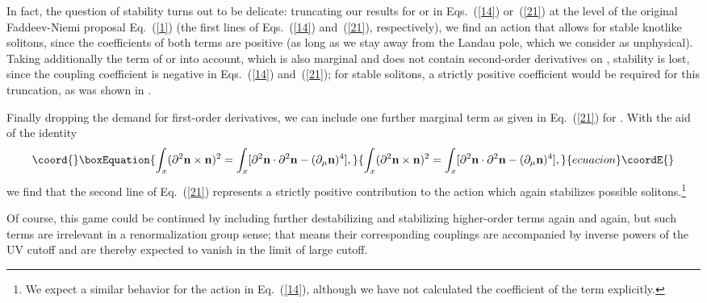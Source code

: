 \documentclass[a4paper,12pt]{article}
\providecommand{\re}[1]{~(\ref{#1})}\usepackage{useful_macros}
\begin{document}
In fact, the question of stability turns out to be delicate:
truncating our results for \coordHE{} or \coordHE{} in
Eqs.\re{14} or\re{21} at the level of the original Faddeev-Niemi
proposal Eq.\re{1} (the first lines of Eqs.\re{14} and\re{21},
respectively), we find an action that allows for stable knotlike
solitons, since the coefficients of both terms are positive (as long
as we stay away from the Landau pole, which we consider as unphysical).
Taking additionally the \coordHE{} term of \coordHE{} or
\coordHE{} into account, which is also marginal and does not contain
second-order derivatives on \myHighlight{$\mn$}\coordHE{}, stability is lost, since the
coupling coefficient is negative in Eqs.\re{14} and\re{21}; for stable
solitons, a strictly positive coefficient would be required for this
truncation, as was shown in \cite{Gladikowski:1997mb}.

Finally dropping the demand for first-order derivatives, we can
include one further marginal term \myHighlight{$\sim
\partial^2\mn\cdot\partial^2\mn$}\coordHE{} as given in Eq.\re{21} for
\coordHE{}. With the aid of the identity
\begin{equation}\coord{}\boxEquation{
\int_x
(\partial^2\mn\times\mn)^2=\int_x[\partial^2\mn\cdot\partial^2\mn
-(\partial_\mu\mn)^4], \label{22}
}{
\int_x
(\partial^2\mn\times\mn)^2=\int_x[\partial^2\mn\cdot\partial^2\mn
-(\partial_\mu\mn)^4], }{ecuacion}\coordE{}\end{equation}
we find that the second line of Eq.\re{21} represents a strictly
positive contribution to the action which again stabilizes possible
solitons.\footnote{We expect a similar behavior for the action
  \coordHE{} in Eq.\re{14}, although we have not calculated
  the coefficient of the \myHighlight{$\partial^2\mn\cdot\partial^2\mn$}\coordHE{} term
  explicitly.} 

Of course, this game could be continued by including further
destabilizing and stabilizing higher-order terms again and again, but
such terms are irrelevant in a renormalization group sense; that means
their corresponding couplings are accompanied by inverse powers of the
UV cutoff \myHighlight{$\Lambda$}\coordHE{} and are thereby expected to vanish in the limit of
large cutoff. 
\end{document}
